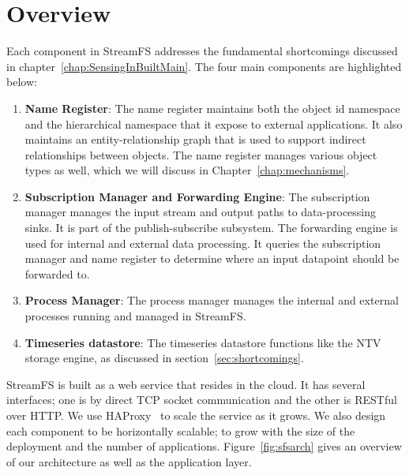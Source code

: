 \section{Overview}
Each component in StreamFS addresses the fundamental shortcomings discussed in chapter~\ref{chap:SensingInBuiltMain}.
The four main components are highlighted below:

\begin{enumerate}

\item \textbf{Name Register}: The name register maintains both the object id namespace and the hierarchical namespace
that it expose to external applications.  It also maintains an entity-relationship graph that is used to support
indirect relationships between objects.  The name register manages various object types as well, which we will discuss
in Chapter~\ref{chap:mechanisms}.

\item \textbf{Subscription Manager and Forwarding Engine}: The subscription manager manages the input stream and output
paths to data-processing sinks.  It is part of the publish-subscribe subsystem.  The forwarding engine is used for internal 
and external data processing.  It queries the
subscription manager and name register to determine where an input datapoint should be forwarded to.

\item \textbf{Process Manager}: The process manager manages the internal and external processes running and managed in StreamFS.

\item \textbf{Timeseries datastore}: The timeseries datastore functions like the NTV storage engine, as discussed in 
section~\ref{sec:shortcomings}.

\end{enumerate}

StreamFS is built as a web service that resides in the cloud.  It has several interfaces; one is by direct TCP socket communication and 
the other is RESTful~\cite{rest} over HTTP.  We use HAProxy~\cite{haproxy} to scale the service as it grows.  We also design each component
to be horizontally scalable; to grow with the size of the deployment and the number of applications.
Figure~\ref{fig:sfsarch} gives an overview of our architecture as well as the application layer.














